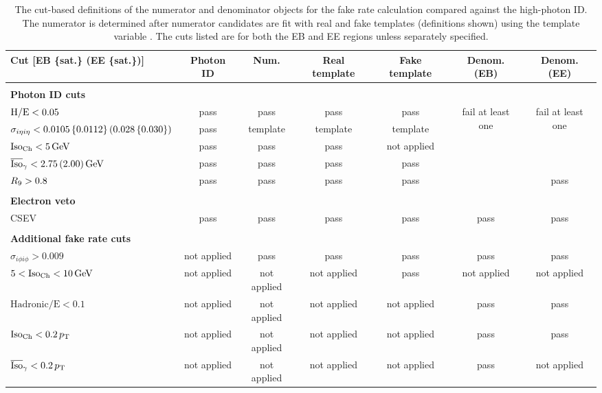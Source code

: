 \begin{table}[!htbp]
  \caption{The cut-based definitions of the numerator and denominator objects for the fake rate calculation compared against the high-\pt photon ID. The numerator is determined after numerator candidates are fit with real and fake templates (definitions shown) using the template variable \sieie. The cuts listed are for both the EB and EE regions unless separately specified.}
  \label{tab:fake_rate_cuts}
  \centering
  \vspace{\baselineskip}
  \tiny
  \begin{tabular}{l|cccccc}
  \hline \hline
  Cut [EB \{sat.\} (EE \{sat.\})] & Photon ID & Num. & Real template & Fake template & Denom. (EB) & Denom. (EE) \\
  \hline
   & & & & & & \\
  \textbf{Photon ID cuts} & & & & & & \\
  \hline
  $\mathrm{H/E} < 0.05$ & pass & pass & pass & pass & \multirow{5}{*}{fail at least one} &  \multirow{4}{*}{fail at least one} \\
  $\sigma_{i\eta i\eta} < 0.0105\, \{0.0112\}\, (0.028\, \{0.030\})$ & pass & template & template & template & & \\
  $\text{Iso}_{\text{Ch}} < 5\,\text{Ge\hspace{-.08em}V}$ & pass & pass & pass & not applied & & \\
  $\overline{\mbox{Iso}}_\gamma < 2.75\, (2.00)\,\text{Ge\hspace{-.08em}V}$ & pass & pass & pass & pass & & pass \\
  $R_{9} > 0.8$ & pass & pass & pass & pass & pass & pass \\
   & & & & & & \\
  \textbf{Electron veto} & & & & & & \\
  \hline
  CSEV & pass & pass & pass & pass & pass & pass \\
   & & & & & & \\
  \textbf{Additional fake rate cuts} & & & & & & \\
  \hline
  $\sigma_{i\phi i\phi} > 0.009$ & not applied & pass & pass & pass & pass & pass \\
  $5 < \text{Iso}_{\text{Ch}} < 10\,\text{Ge\hspace{-.08em}V}$ & not applied & not applied & not applied & pass & not applied & not applied \\
  $\text{Hadronic/E} < 0.1$ & not applied & not applied & not applied & not applied & pass & pass \\
  $\text{Iso}_{\text{Ch}} < 0.2\,p_{\mathrm{T}}$ & not applied & not applied & not applied & not applied & pass & pass \\
  $\overline{\mbox{Iso}}_\gamma < 0.2\,p_{\mathrm{T}}$ & not applied & not applied & not applied & not applied & pass & not applied \\
  \hline \hline
  \end{tabular}
\end{table}

